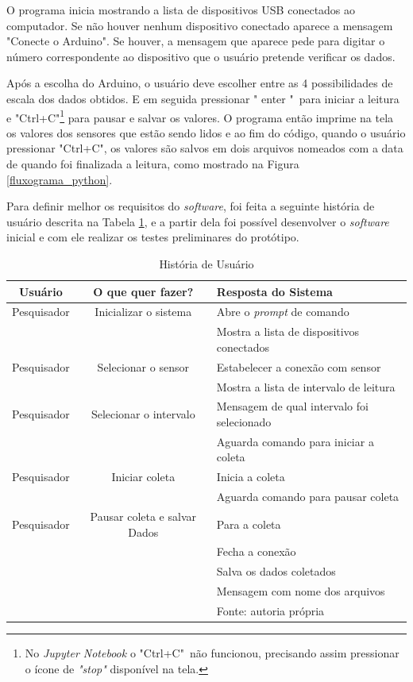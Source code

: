 		O programa inicia mostrando a lista de dispositivos USB conectados ao computador. Se não houver nenhum dispositivo conectado aparece a mensagem "Conecte o Arduino". Se houver, a mensagem que aparece pede para digitar o número correspondente ao dispositivo que o usuário pretende verificar os dados. 
		
		Após a escolha do Arduino, o usuário deve escolher entre as 4 possibilidades de escala dos dados obtidos. E em seguida pressionar " enter "\ para iniciar a leitura e "Ctrl+C"\footnote{No \textit{Jupyter Notebook} o "Ctrl+C"\ não funcionou, precisando assim pressionar o ícone de \textit{"stop"} disponível na tela.} para pausar e salvar os valores. O programa então imprime na tela os valores dos sensores que estão sendo lidos e ao fim do código, quando o usuário pressionar "Ctrl+C", os valores são salvos em dois arquivos nomeados com a data de quando foi finalizada a leitura, como mostrado na Figura \ref{fluxograma_python}.
		
		Para definir melhor os requisitos do \textit{software}, foi feita a seguinte história de usuário descrita na Tabela \ref{User_story}, e a partir dela foi possível desenvolver o \textit{software} inicial e com ele realizar os testes preliminares do protótipo.
		
			\begin{table}[h] \footnotesize
			\centering
			\caption{História de Usuário}
			\label{User_story}
			
			\begin{tabular}{ccl}
				\toprule
				\textbf{Usuário} & \textbf{O que quer fazer?} & \textbf{Resposta do Sistema} \\
				\midrule
				Pesquisador & Inicializar o sistema &  Abre o \textit{prompt} de comando \\
				 & & Mostra a lista de dispositivos conectados \\
				Pesquisador & Selecionar o sensor & Estabelecer a conexão com sensor \\
				& & Mostra a lista de intervalo de leitura\\
				Pesquisador & Selecionar o intervalo & Mensagem de qual intervalo foi selecionado\\
				& & Aguarda comando para iniciar a coleta\\
				Pesquisador & Iniciar coleta & Inicia a coleta\\
				& &  Aguarda comando para pausar coleta\\
				Pesquisador & Pausar coleta e salvar Dados & Para a coleta\\
				& & Fecha a conexão\\
				& & Salva os dados coletados\\
				& & Mensagem com nome dos arquivos\\  
 				
				\bottomrule
				 & & Fonte: autoria própria
			\end{tabular}
		\end{table}
		
